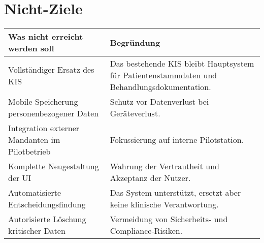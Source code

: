 \section{Nicht-Ziele}
\begin{center}
	\begin{tabular}{|p{5cm}|p{10cm}|}
		\hline
		\textbf{Was nicht erreicht werden soll} & \textbf{Begründung} \\
		\hline
		Vollständiger Ersatz des KIS & Das bestehende KIS bleibt Hauptsystem für Patientenstammdaten und Behandlungsdokumentation. \\
		\hline
		Mobile Speicherung personenbezogener Daten & Schutz vor Datenverlust bei Geräteverlust. \\
		\hline
		Integration externer Mandanten im Pilotbetrieb & Fokussierung auf interne Pilotstation. \\
		\hline
		Komplette Neugestaltung der UI & Wahrung der Vertrautheit und Akzeptanz der Nutzer. \\
		\hline
		Automatisierte Entscheidungsfindung & Das System unterstützt, ersetzt aber keine klinische Verantwortung. \\
		\hline
		Autorisierte Löschung kritischer Daten & Vermeidung von Sicherheits- und Compliance-Risiken. \\
		\hline
	\end{tabular}
\end{center}